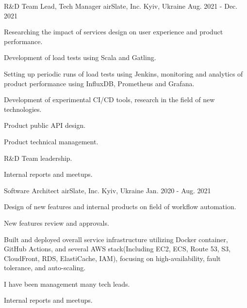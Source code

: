 
\begin{cventries}

  \cventry
    {R\&D Team Lead, Tech Manager}
    {airSlate, Inc.}
    {Kyiv, Ukraine}
    {Aug. 2021 - Dec. 2021}
    {
      \begin{cvitems}
        \item {Researching the impact of services design on user experience and product performance.}
        \item {Development of load tests using Scala and Gatling.}
        \item {Setting up periodic runs of load tests using Jenkins, monitoring and analytics of product performance using InfluxDB, Prometheus and Grafana.}
        \item {Development of experimental CI/CD tools, research in the field of new technologies.}
        \item {Product public API design.}
        \item {Product technical management.}
        \item {R\&D Team leadership.}
        \item {Internal reports and meetups.}
      \end{cvitems}
    }

  \cventry
    {Software Architect}
    {airSlate, Inc.}
    {Kyiv, Ukraine}
    {Jan. 2020 - Aug. 2021}
    {
      \begin{cvitems}
        \item {Design of new features and internal products on field of workflow automation.}
        \item {New features review and approvals.}
        \item {Built and deployed overall service infrastructure utilizing Docker container, GitHub Actions, and several AWS stack(Including EC2, ECS, Route 53, S3, CloudFront, RDS, ElastiCache, IAM), focusing on high-availability, fault tolerance, and auto-scaling.}
        \item {I have been management many tech leads.}
        \item {Internal reports and meetups.}
      \end{cvitems}
    }


\end{cventries}
